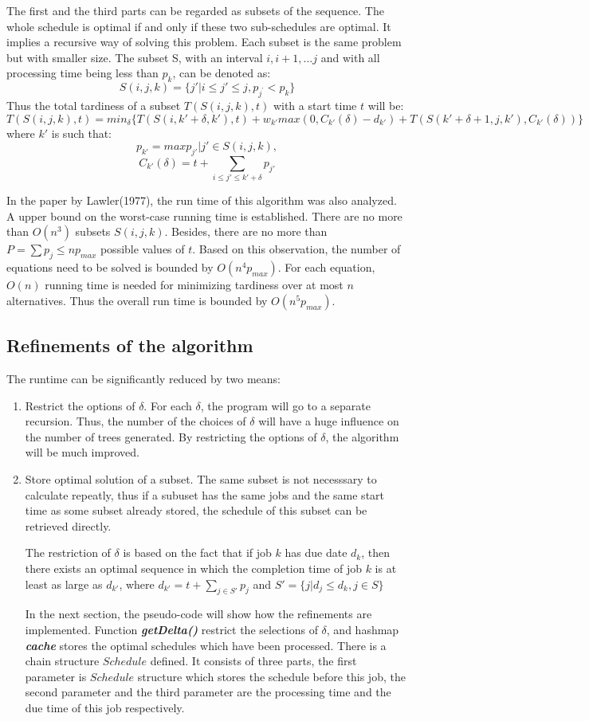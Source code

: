 \documentclass[11pt]{article}
\begin{document}
The first and the third parts can be regarded as subsets of the sequence. The whole schedule is optimal if and only if these two sub-schedules are optimal. It implies a recursive way of solving this problem. Each subset is the same problem but with smaller size. The subset S, with an interval $i,i+1,...j$ and with all processing time being less than $p_k$, can be denoted as:
$$S(i,j,k)=\{j'|i\leq j'\leq j, p_{j^{'}}<p_k\}$$
Thus the total tardiness of a subset $T(S(i,j,k),t)$ with a start time $t$ will be:
$$T(S(i,j,k),t)=min_{\delta} \{ T(S(i,k'+\delta,k'),t)+w_{k'}max(0,C_{k{'}}(\delta)-d_{k'})+T(S(k'+\delta+1,j,k'),C_{k'}(\delta)) \}$$
where $k'$ is such that:$$p_{k'}=max{p_{j'}|j' \in S(i,j,k)},$$
$$C_{k'}(\delta) =t+\sum_{i\leq j' \leq k'+\delta}p_{j'}$$ 

In the paper by Lawler(1977), the run time of this algorithm was also analyzed. A upper bound on the worst-case running time is established. There are no more than $O(n^3)$ subsets $S(i,j,k)$. Besides, there are no more than $P=\sum p_j \leq np_{max}$ possible values of $t$. Based on this observation, the number of equations need to be solved is bounded by $O(n^4p_{max})$. For each equation, $O(n)$ running time is needed for minimizing tardiness over at most $n$ alternatives. Thus the overall run time is bounded by $O(n^5p_{max})$.
\subsection{Refinements of the algorithm}

The runtime can be significantly reduced by two means:
\begin{enumerate}
\item Restrict the options of $\delta$. For each $\delta$, the program will go to a separate recursion. Thus, the number of the choices of $\delta$ will have a huge influence on the number of trees generated. By restricting the options of $\delta$, the algorithm will be much improved. 
\item Store optimal solution of a subset. The same subset is not necesssary to calculate repeatly, thus if a subuset has the same jobs and the same start time as some subset already stored, the schedule of this subset can be retrieved directly.

The restriction of $\delta$ is based on the fact that if job $k$ has due date $d_k$, then there exists an optimal sequence in which the completion time of job $k$ is at least as large as $d_{k'}$, where $d_{k'}=t+\sum _{j\in S'}p_j$ and $S'=\{ j| d_j \leq d_k, j\in S \}$

In the next section, the pseudo-code will show how the refinements are implemented. Function \textbf{\textit{getDelta()}} restrict the selections of $\delta$, and hashmap \textbf{\textit{cache}} stores the optimal schedules which have been processed. There is a chain structure $Schedule$ defined. It consists of three parts, the first parameter is $Schedule$ structure which stores the schedule before this job, the second parameter and the third parameter are the processing time and the due time of this job respectively.
\end{enumerate}
\end{document}
